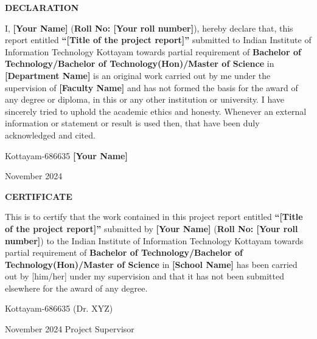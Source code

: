 \documentclass[12pt,a4wide]{report}
\theoremstyle{plain}
\theoremstyle{definition}
\theoremstyle{remark}
\begin{document}
\clearpage
 \setcounter{page}{2}
\begin{center}
{\large{\bf{DECLARATION}}}
\end{center}


\noindent I, \textbf{[Your Name]} (\textbf{Roll No: [Your roll
number]}), hereby declare that, this report entitled
\textbf{``[Title of the project report]''} submitted to Indian
Institute of Information Technology Kottayam towards partial
requirement of {\bf Bachelor of Technology/Bachelor of
Technology(Hon)/Master of Science} in \textbf{[Department  Name]}
is an original work carried out by me under the supervision of
\textbf{[Faculty Name]} and has not formed the basis for the award
of any degree or diploma, in this or any other institution or
university. I have sincerely tried to uphold the academic ethics
and honesty. Whenever an external information or statement or
result is used then, that have been duly acknowledged and cited.

\vspace{4cm}

\noindent Kottayam-686635 \hfill \textbf{[Your Name]}

\noindent November  2024

\clearpage


 \setcounter{page}{3}
\begin{center}
{\large{\bf{CERTIFICATE}}}
\end{center}


\noindent This is to certify that the work contained in this
project report entitled \textbf{``[Title of the project report]''}
submitted by \textbf{[Your Name]} (\textbf{Roll No: [Your roll
number]}) to the Indian Institute of Information Technology Kottayam
towards partial requirement of {\bf Bachelor of
Technology/Bachelor of Technology(Hon)/Master of Science} in
\textbf{[School Name]} has been carried out by [him/her] under my
supervision and that it has not been submitted elsewhere for the
award of any degree.


\vspace{4cm}

\noindent Kottayam-686635  \hfill (Dr. XYZ)

\noindent November  2024 \hfill Project Supervisor

\clearpage
\end{document}
